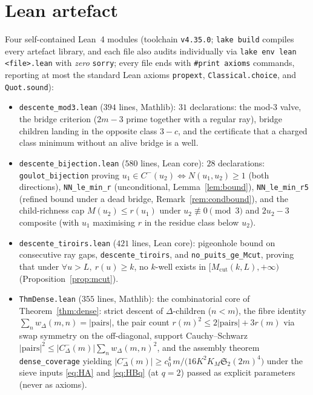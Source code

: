 \documentclass[11pt]{article}
\theoremstyle{plain}
\theoremstyle{definition}
\newcommand{\rch}{r}
\newcommand{\Mcut}{M_{\mathrm{cut}}}
\begin{document}
\section{Lean artefact}
\label{app:lean}

Four self-contained Lean~4 modules (toolchain \texttt{v4.35.0};
\texttt{lake build} compiles every artefact library, and each file
also audits individually via \texttt{lake env lean <file>.lean} with
\emph{zero} \texttt{sorry}; every file ends with
\texttt{\#print axioms} commands, reporting at most the standard
Lean axioms \texttt{propext}, \texttt{Classical.choice}, and
\texttt{Quot.sound}):

\begin{itemize}
\item \texttt{descente\_mod3.lean} ($394$ lines, Mathlib): $31$
      declarations: the mod-3 valve, the bridge criterion
      ($2m-3$ prime together with a regular ray), bridge children
      landing in the opposite class $3 - c$, and the certificate
      that a charged class minimum without an alive bridge is a
      well.
\item \texttt{descente\_bijection.lean} ($580$ lines, Lean core):
      $28$ declarations: \texttt{goulot\_bijection} proving
      $u_1 \in C^{-}(u_2) \Longleftrightarrow N(u_1,u_2) \ge 1$
      (both directions), \texttt{NN\_le\_min\_r} (unconditional,
      Lemma~\ref{lem:bound}), \texttt{NN\_le\_min\_r5} (refined
      bound under a dead bridge, Remark~\ref{rem:condbound}), and
      the child-richness cap $M(u_2) \le \rch(u_1)$ under
      $u_2 \not\equiv 0 \pmod 3$ and $2u_2 - 3$ composite (with
      $u_1$ maximising $\rch$ in the residue class below $u_2$).
\item \texttt{descente\_tiroirs.lean} ($421$ lines, Lean core):
      pigeonhole bound on consecutive ray gaps,
      \texttt{descente\_tiroirs}, and \texttt{no\_puits\_ge\_Mcut},
      proving that under $\forall u > L,\ \rch(u) \ge k$, no
      $k$-well exists in $[\Mcut(k,L), +\infty)$
      (Proposition~\ref{prop:mcut}).
\item \texttt{ThmDense.lean} ($355$ lines, Mathlib): the
      combinatorial core of Theorem~\ref{thm:dense}: strict descent
      of $\Delta$-children ($n < m$), the fibre identity
      $\sum_n w_\Delta(m,n) = |\mathrm{pairs}|$, the pair count
      $\rch(m)^2 \le 2|\mathrm{pairs}| + 3\rch(m)$ via swap symmetry
      on the off-diagonal, support Cauchy--Schwarz
      $|\mathrm{pairs}|^2 \le |C_\Delta^{-}(m)| \sum_n w_\Delta(m,n)^2$,
      and the assembly theorem \texttt{dense\_coverage} yielding
      $|C_\Delta^{-}(m)| \ge
      c_0^4\, m \big/ \bigl(16 K^2 K_M \mathfrak{S}_2(2m)^4\bigr)$
      under the sieve inputs \eqref{eq:HA} and \eqref{eq:HBq}
      (at $q = 2$) passed
      as explicit parameters (never as axioms).
\end{itemize}
\end{document}
